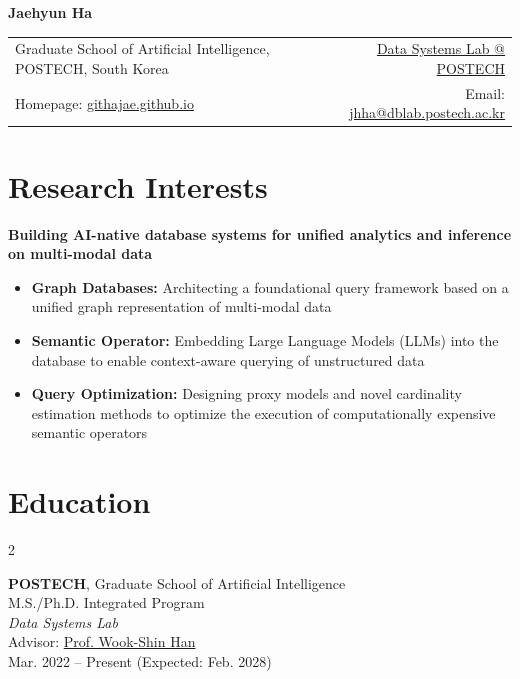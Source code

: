 \documentclass[10pt, letterpaper]{article}
\newenvironment{twocolentry}[2][]{
    \onecolentry
    \def\secondColumn{#2}
    \setcolumnwidth{\fill, 4.5cm}
    \begin{paracol}{2}
}{
    \switchcolumn \raggedleft \secondColumn
    \end{paracol}
    \endonecolentry
}
\begin{document}
\begin{center}
    {\LARGE \textbf{Jaehyun Ha}} \\[5pt]
\end{center}

\begin{tabularx}{\textwidth}{X r}
Graduate School of Artificial Intelligence, POSTECH, South Korea &
\href{https://dslab.postech.ac.kr/}{Data Systems Lab @ POSTECH}
\\
Homepage: \href{https://githajae.github.io}{githajae.github.io} &
Email: \href{mailto:jhha@dblab.postech.ac.kr}{jhha@dblab.postech.ac.kr}
\\
\end{tabularx}

\vspace{0.4cm}

\section*{Research Interests}

\vspace{1mm}
\noindent
\textbf{Building AI-native database systems for unified analytics and inference on multi-modal data}

\begin{itemize}
    \itemsep0.5em
    \item \textbf{Graph Databases:} Architecting a foundational query framework based on a unified graph representation of multi-modal data

    \item \textbf{Semantic Operator:} Embedding Large Language Models (LLMs) into the database to enable context-aware querying of unstructured data

    \item \textbf{Query Optimization:} Designing proxy models and novel cardinality estimation methods to optimize the execution of computationally expensive semantic operators
\end{itemize}

\section{Education}
\begin{twocolentry}{Mar. 2022 -- Present \;\; (Expected: Feb. 2028)}
\textbf{POSTECH}, Graduate School of Artificial Intelligence\\
M.S./Ph.D. Integrated Program\\
\textit{Data Systems Lab} \\
Advisor: \href{https://wscrony.github.io/}{Prof. Wook-Shin Han}\\
\end{twocolentry}
\end{document}
